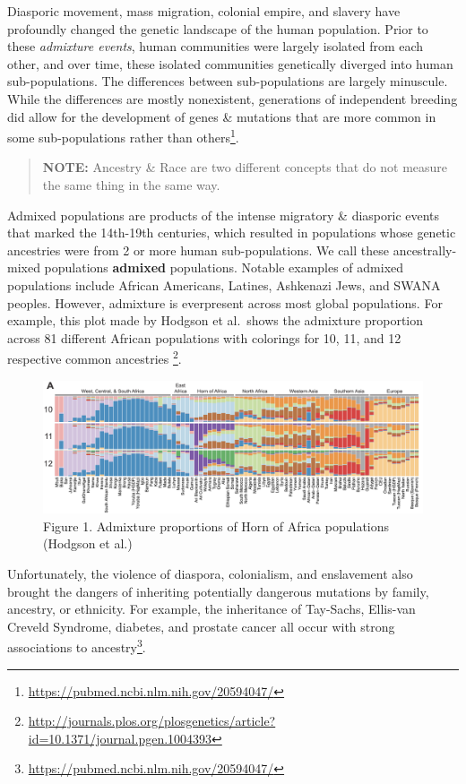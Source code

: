 \documentclass[
]{book}
\begin{document}
Diasporic movement, mass migration, colonial empire, and slavery have profoundly changed the genetic landscape of the human population. Prior to these \emph{admixture events}, human communities were largely isolated from each other, and over time, these isolated communities genetically diverged into human sub-populations. The differences between sub-populations are largely minuscule. While the differences are mostly nonexistent, generations of independent breeding did allow for the development of genes \& mutations that are more common in some sub-populations rather than others\footnote{\url{https://pubmed.ncbi.nlm.nih.gov/20594047/}}.

\begin{quote}
\textbf{NOTE:} Ancestry \& Race are two different concepts that do not measure the same thing in the same way.
\end{quote}

Admixed populations are products of the intense migratory \& diasporic events that marked the 14th-19th centuries, which resulted in populations whose genetic ancestries were from 2 or more human sub-populations. We call these ancestrally-mixed populations \textbf{admixed} populations. Notable examples of admixed populations include African Americans, Latines, Ashkenazi Jews, and SWANA peoples. However, admixture is everpresent across most global populations. For example, this plot made by Hodgson et al.~shows the admixture proportion across 81 different African populations with colorings for 10, 11, and 12 respective common ancestries \footnote{\url{http://journals.plos.org/plosgenetics/article?id=10.1371/journal.pgen.1004393}}.

\hfill\break

\begin{figure}
\centering
\includegraphics{images/map.png}
\caption{Figure 1. Admixture proportions of Horn of Africa populations (Hodgson et al.)}
\end{figure}

\hfill\break

Unfortunately, the violence of diaspora, colonialism, and enslavement also brought the dangers of inheriting potentially dangerous mutations by family, ancestry, or ethnicity. For example, the inheritance of Tay-Sachs, Ellis-van Creveld Syndrome, diabetes, and prostate cancer all occur with strong associations to ancestry\footnote{\url{https://pubmed.ncbi.nlm.nih.gov/20594047/}}.
\end{document}
